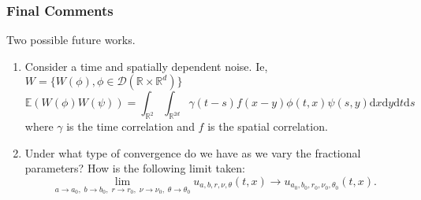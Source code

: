 \documentclass{beamer}%
\numberwithin{equation}{section}
\newcommand{\R}{\mathbb{R}}
\newcommand{\ud}{\ensuremath{\mathrm{d} }}
\begin{document}
	\begin{frame}[t]
		\frametitle{Final Comments}
			Two possible future works.
				\begin{enumerate}
					\item Consider a time and spatially dependent noise. Ie, $W = \{W(\phi), \phi \in \mathcal{D}(\R \times \R^d)\}$
						\[
							\mathbb{E}(W(\phi)W(\psi)) = \int_{\R^{2}}\int_{\R^{2d}} \gamma(t-s)f(x-y)\phi(t,x)\psi(s,y) \ud x\ud y \ud t \ud s
						\]
					where $\gamma$ is the time correlation and $f$ is the spatial correlation.
					\item Under what type of convergence do we have as we vary the fractional parameters? How is the following limit taken:
						\[
							\lim_{a \to a_0, \; b \to b_0, \; r \to r_0, \; \nu \to \nu_0, \; \theta \to \theta_0} u_{a,b,r,\nu,\theta}(t,x) \to u_{a_0,b_0,r_0,\nu_0,\theta_0}(t,x).
						\]

				\end{enumerate}

	\end{frame}
\end{document}
